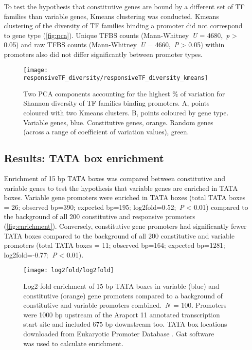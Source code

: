 To test the hypothesis that constitutive genes are bound by a different set of TF families than variable genes, Kmeans clustering was conducted. Kmeans clustering of the diversity of TF families binding a promoter did not correspond to gene type (\autoref{fig:pca}).
Unique TFBS counts (Mann\hyp{}Whitney~\textit{U} = 4680,~\textit{p} \textgreater{} 0.05)
and raw TFBS counts (Mann\hyp{}Whitney~\textit{U} = 4660,~\textit{P}
\textgreater{} 0.05) within promoters also did not differ significantly between promoter types.

\begin{figure}[!ht]
	\begin{center}
		\capstart
		\texttt{[image: responsiveTF\_diversity/responsiveTF\_diversity\_kmeans]}
		\caption{Two PCA components accounting for the highest \si{\percent} of variation for Shannon diversity of TF families binding promoters. A, points coloured with two Kmeans clusters. B, points coloured by gene type. Variable genes, blue. Constitutive genes, orange. Random genes (across a range of coefficient of variation values), green.
			\label{fig:pca}
		}
	\end{center}
\end{figure}

\subsection{Results: TATA box enrichment}
Enrichment of 15 bp TATA boxes was compared between constitutive and
variable genes to test the hypothesis that variable genes are enriched in TATA boxes. Variable gene promoters were enriched in TATA boxes (total TATA boxes = 26; observed bp=390; expected bp=195; log2fold=0.52;~\textit{P} \textless{} 0.01) compared to the background of all 200 constitutive and responsive promoters
(\autoref{fig:enrichment}). Conversely, constitutive gene
promoters had significantly fewer TATA boxes compared to the background of all 200 constitutive and variable promoters (total TATA boxes = 11; observed bp=164; expected bp=1281; log2fold=-0.77;~\textit{P} \textless{} 0.01).

\begin{figure}[!h]
\begin{center}
\capstart
\texttt{[image: log2fold/log2fold]}
\caption{Log2\hyp{}fold enrichment of 15 bp TATA boxes in variable (blue) and constitutive (orange) gene promoters compared to a background of
constitutive and variable promoters combined.~\textit{N~}= 100. Promoters were 1000 bp upstream of the Araport 11 \autocite{chengAraport11CompleteReannotation2017} annotated
transcription start site and included 675 bp downstream too. TATA box
locations downloaded from Eukaryotic Promoter Database
\autocite{dreosInfluenceRotationalNucleosome2016}. Gat software~\autocite{hegerGATSimulationFramework2013} was used to calculate enrichment.
\label{fig:enrichment}
}
\end{center}
\end{figure}

